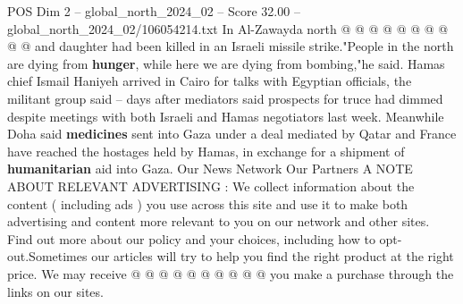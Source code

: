 \begin{textsample}{POS Dim 2 – global\_north\_2024\_02 – Score 32.00 – global\_north\_2024\_02/106054214.txt}
In Al-Zawayda north @ @ @ @ @ @ @ @ @ @ and daughter had been killed in an Israeli missile strike."People in the north are dying from \textbf{hunger}, while here we are dying from bombing,"he said.
Hamas chief Ismail Haniyeh arrived in Cairo for talks with Egyptian officials, the militant group said -- days after mediators said prospects for truce had dimmed despite meetings with both Israeli and Hamas negotiators last week.
Meanwhile Doha said \textbf{medicines} sent into Gaza under a deal mediated by Qatar and France have reached the hostages held by Hamas, in exchange for a shipment of \textbf{humanitarian} aid into Gaza.
Our News Network Our Partners A NOTE ABOUT RELEVANT ADVERTISING : We collect information about the content ( including ads ) you use across this site and use it to make both advertising and content more relevant to you on our network and other sites.
Find out more about our policy and your choices, including how to opt-out.Sometimes our articles will try to help you find the right product at the right price.
We may receive @ @ @ @ @ @ @ @ @ @ you make a purchase through the links on our sites.

\end{textsample}
